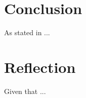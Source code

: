 \documentclass[a4paper]{article}
\begin{document}
\section{Conclusion}
\label{sec:conclusion}

As stated in ...


\section{Reflection}
\label{sec:reflection}
Given that ...






\end{document}
